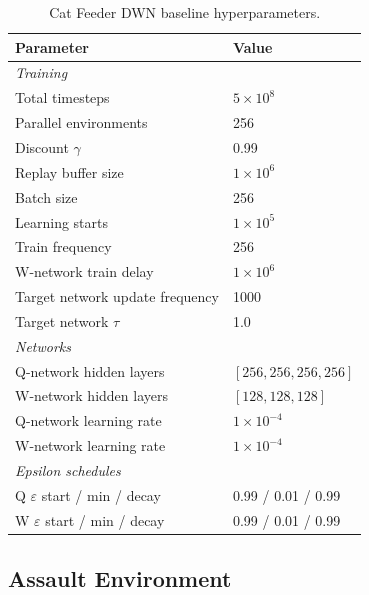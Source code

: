 \begin{table}[h]
\caption{Cat Feeder DWN baseline hyperparameters.}
\label{tab:cat-feeder-dwn-hparams}
\centering
\begin{tabular}{ll}
\toprule
Parameter & Value \\
\midrule
\multicolumn{2}{l}{\textit{Training}} \\
Total timesteps & $5 \times 10^{8}$ \\
Parallel environments & 256 \\
Discount $\gamma$ & 0.99 \\
Replay buffer size & $1 \times 10^{6}$ \\
Batch size & 256 \\
Learning starts & $1 \times 10^{5}$ \\
Train frequency & 256 \\
W-network train delay & $1 \times 10^{6}$ \\
Target network update frequency & 1000 \\
Target network $\tau$ & 1.0 \\
\midrule
\multicolumn{2}{l}{\textit{Networks}} \\
Q-network hidden layers & $[256, 256, 256, 256]$ \\
W-network hidden layers & $[128, 128, 128]$ \\
Q-network learning rate & $1 \times 10^{-4}$ \\
W-network learning rate & $1 \times 10^{-4}$ \\
\midrule
\multicolumn{2}{l}{\textit{Epsilon schedules}} \\
Q $\varepsilon$ start / min / decay & 0.99 / 0.01 / 0.99 \\
W $\varepsilon$ start / min / decay & 0.99 / 0.01 / 0.99 \\
\bottomrule
\end{tabular}
\end{table}

\subsection{Assault Environment}

